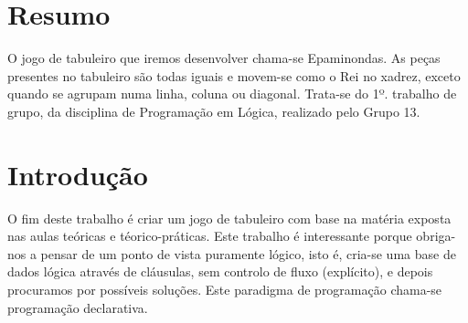 \documentclass[a4paper]{article}
\begin{document}
\newpage

\section*{Resumo}
O jogo de tabuleiro que iremos desenvolver chama-se Epaminondas. As peças presentes no tabuleiro são todas
iguais e movem-se como o Rei no xadrez, exceto quando se agrupam numa linha, coluna ou diagonal. Trata-se
do 1º. trabalho de grupo, da disciplina de Programação em Lógica, realizado pelo Grupo 13.



\section{Introdução}
O fim deste trabalho é criar um jogo de tabuleiro com base na matéria exposta nas aulas teóricas e téorico-práticas.
Este trabalho é interessante porque obriga-nos a pensar de um ponto de vista puramente lógico, isto é, cria-se uma base de dados
lógica através de cláusulas, sem controlo de fluxo (explícito), e depois procuramos por possíveis soluções. Este paradigma de programação
chama-se programação declarativa.






\end{document}
